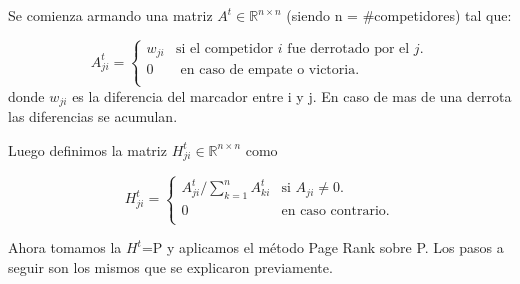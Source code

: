 \par Se comienza armando una matriz $A^t \in \mathbb{R}^{n \times n}$ (siendo n = \#competidores) tal que:

\begin{equation*}
A_{ji}^t = \left\{
	\begin{array}{cl}
	w_{ji} & \text{si el competidor } i \text{ fue derrotado por el } j.\\
	0 & \text{ en caso de empate o victoria. }\\
	\end{array} \right.
\end{equation*}
donde $w_{ji}$ es la diferencia del marcador entre i y j. En caso de mas de una derrota las diferencias se acumulan.

\par Luego definimos la matriz $H_{ji}^t \in \mathbb{R}^{n \times n}$ como

\begin{equation*}
H_{ji}^t = \left\{
	\begin{array}{cl}
	A_{ji}^t/\sum_{k = 1}^n A_{ki}^t & \text{si }A_{ji} \neq 0.\\
	0 & \text{en caso contrario.}\\
	\end{array} \right.
\end{equation*}

\par Ahora tomamos la $H^t$=P y aplicamos el m\'etodo Page Rank sobre P. Los pasos a seguir son los mismos que se explicaron previamente.
